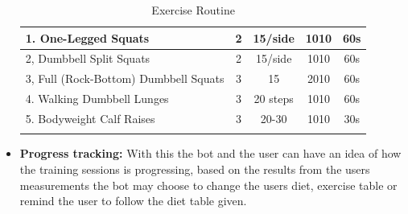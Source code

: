 \begin{itemize}
\begin{table}
{\begin{tabular}{|l|c|c|c|c|}
				\hline
				1. One-Legged Squats                                                                                & 2                                            & 15/side                                          & 1010                                               & 60s                                              \\ 
				\hline
				2, Dumbbell Split Squats                                                                            & 2                                            & 15/side                                          & 1010                                               & 60s                                              \\ 
				\hline
				3, Full (Rock-Bottom) Dumbbell Squats                                                               & 3                                            & 15                                               & 2010                                               & 60s                                              \\ 
				\hline
				4. Walking Dumbbell Lunges                                                                          & 3                                            & 20 steps                                         & 1010                                               & 60s                                              \\ 
				\hline
				5. Bodyweight Calf Raises                                                                           & 3                                            & 20-30                                            & 1010                                               & 30s                                              \\ 
				\hline
				\multicolumn{5}{|l|}{{\cellcolor[rgb]{0.753,0.753,0.753}}}                                                                                                                                                                                                                                                    \\
				\hline
		\end{tabular}}
		\caption{Exercise Routine}
		\label{routine}
	\end{table}
	\clearpage
	\item{\textbf{Progress tracking:} With this the bot and the user can have an idea of how the training sessions is progressing, based on the results from the users measurements  the bot may choose to change the users diet, exercise table or remind the user to follow the diet table given.
}
\end{itemize}
